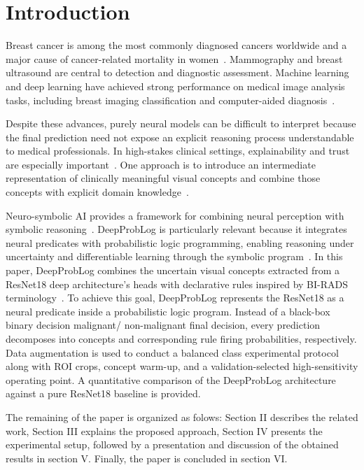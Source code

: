 \section{Introduction}
\label{sec:introduction}

Breast cancer is among the most commonly diagnosed cancers worldwide and a major cause of cancer-related mortality in women~\cite{sung2021global}. Mammography and breast ultrasound are central to detection and diagnostic assessment. Machine learning and deep learning have achieved strong performance on medical image analysis tasks, including breast imaging classification and computer-aided diagnosis~\cite{litjens2017survey,balkenende2022application}.

Despite these advances, purely neural models can be difficult to interpret because the final prediction need not expose an explicit reasoning process understandable to medical professionals. In high-stakes clinical settings, explainability and trust are especially important~\cite{rudin2019stop,vandervelden2022xai}. One approach is to introduce an intermediate representation of clinically meaningful visual concepts and combine those concepts with explicit domain knowledge~\cite{koh2020concept}.

Neuro-symbolic AI provides a framework for combining neural perception with symbolic reasoning~\cite{garcez2002neural,garcez2023neurosymbolic}. DeepProbLog is particularly relevant because it integrates neural predicates with probabilistic logic programming, enabling reasoning under uncertainty and differentiable learning through the symbolic program~\cite{manhaeve2018deepproblog,manhaeve2021neural}. In this paper, DeepProbLog combines the uncertain visual concepts extracted from a ResNet18 deep architecture's heads with declarative rules inspired by BI-RADS terminology~\cite{acr2013birads}. To achieve this goal, DeepProbLog represents the ResNet18 as a neural predicate inside a probabilistic logic program. Instead of a black-box binary decision malignant/ non-malignant final decision, every prediction decomposes into concepts and  corresponding rule firing probabilities, respectively. Data augmentation is used to conduct a balanced class experimental protocol along with ROI crops, concept warm-up, and a validation-selected high-sensitivity operating point. A quantitative comparison of the DeepProbLog architecture against a pure ResNet18 baseline is provided.

The remaining of the paper is organized as folows: Section II describes the related work, Section III explains the proposed approach, Section IV presents the experimental setup, followed by a presentation and discussion of the obtained results in section V. Finally, the paper is concluded in section VI.